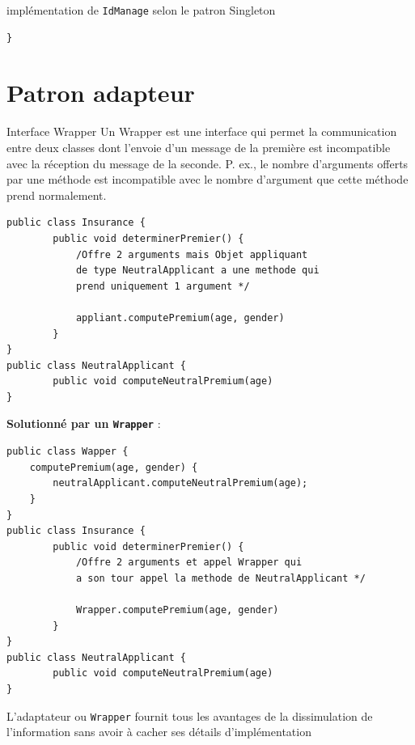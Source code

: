 \documentclass[16pt]{report}
\begin{document}
\begin{multicols*}{2}
\begin{EExample}{implémentation de \texttt{IdManage} selon le patron Singleton  }{}
\begin{lstlisting}[style=JavaDraculaWhite]
}
\end{lstlisting}
        \end{EExample}      
        \section{Patron adapteur}


        \begin{Concept}{Interface Wrapper}{}
            Un Wrapper est une interface qui permet la communication entre deux classes 
            dont \textcolor{myb}{l'envoie d'un message} de la première est incompatible avec la 
            \textcolor{myb}{réception} du message de la seconde. P. ex., le nombre d'arguments 
            offerts par une méthode est incompatible avec le nombre d'argument que cette méthode prend 
            normalement.
        \end{Concept}


\begin{lstlisting}[style=JavaDraculaWhite]
public class Insurance {
        public void determinerPremier() {
            /Offre 2 arguments mais Objet appliquant 
            de type NeutralApplicant a une methode qui 
            prend uniquement 1 argument */ 

            appliant.computePremium(age, gender)
        }
}
public class NeutralApplicant {
        public void computeNeutralPremium(age)
}
\end{lstlisting}

\textbf{Solutionné par un \texttt{Wrapper}} :     



\begin{lstlisting}[style=JavaDraculaWhite]
public class Wapper {
    computePremium(age, gender) {
        neutralApplicant.computeNeutralPremium(age);
    }
}
public class Insurance {
        public void determinerPremier() {
            /Offre 2 arguments et appel Wrapper qui  
            a son tour appel la methode de NeutralApplicant */ 

            Wrapper.computePremium(age, gender)
        }
}
public class NeutralApplicant {
        public void computeNeutralPremium(age)
}
\end{lstlisting}

        \begin{note}{}{}
            L'adaptateur ou \texttt{Wrapper}  fournit tous les avantages de la \textcolor{myb}{dissimulation de
            l’information} sans avoir à cacher ses détails d’implémentation
        \end{note}          



\end{multicols*}
\end{document}

